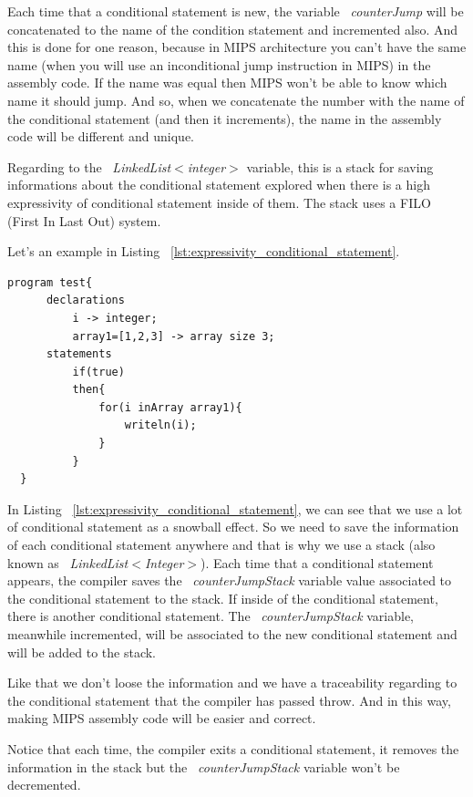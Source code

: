 \documentclass[
  oneside,
  11pt, a4paper,
  footinclude=true,
  headinclude=true,
  cleardoublepage=empty
]{scrbook}
\begin{document}
Each time that a conditional statement is new, the variable ~\textit{counterJump} will be concatenated to the name of the condition statement and incremented also. And this is done for one reason, because in MIPS architecture you can't have the same name (when you will use an inconditional jump instruction in MIPS) in the assembly code. If the name was equal then MIPS won't be able to know which name it should jump. And so, when we concatenate the number with the name of the conditional statement (and then it increments), the name in the assembly code will be different and unique.

Regarding to the ~\textit{LinkedList$<$integer$>$} variable, this is a stack for saving informations about the conditional statement explored when there is a high expressivity of conditional statement inside of them. The stack uses a FILO (First In Last Out) system.

Let's an example in Listing ~\ref{lst:expressivity_conditional_statement}.

\begin{lstlisting}[caption={Example of conditional statements in LISS language},label={lst:expressivity_conditional_statement}]
  program test{
      declarations
          i -> integer;
          array1=[1,2,3] -> array size 3;
      statements
          if(true)
          then{
              for(i inArray array1){
                  writeln(i);
              }
          }
  }
\end{lstlisting}

In Listing ~\ref{lst:expressivity_conditional_statement}, we can see that we use a lot of conditional statement as a snowball effect.
So we need to save the information of each conditional statement anywhere and that is why we use a stack (also known as ~\textit{LinkedList$<$Integer$>$}).
Each time that a conditional statement appears, the compiler saves the ~\textit{counterJumpStack} variable value associated to the conditional statement to the stack. If inside of the conditional statement, there is another conditional statement. The ~\textit{counterJumpStack} variable, meanwhile incremented, will be associated to the new conditional statement and will be added to the stack. 

Like that we don't loose the information and we have a traceability regarding to the conditional statement that the compiler has passed throw. And in this way, making MIPS assembly code will be easier and correct.

Notice that each time, the compiler exits a conditional statement, it removes the information in the stack but the ~\textit{counterJumpStack} variable won't be decremented.
\end{document}
